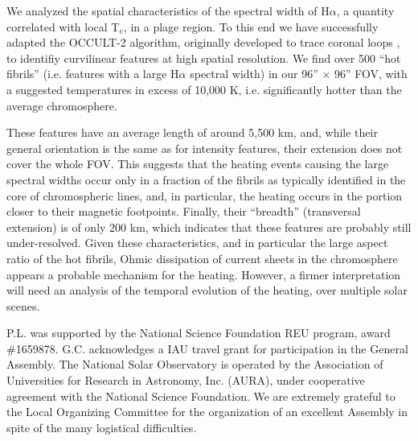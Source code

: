 \documentclass{iau}
\begin{document}
We analyzed the spatial characteristics of the spectral width of H$\alpha$, a quantity correlated with local T$_e$, in a plage region. To this end we have successfully adapted the OCCULT-2 algorithm, originally developed to trace coronal loops \citep{2013Entrp..15.3007A}, to identifiy curvilinear features at high spatial resolution. We find 
over 500 ``hot fibrils'' (i.e. features with a large H$\alpha$ spectral width) in our 96'' $\times$ 96'' FOV, with a suggested temperatures in excess of 10,000 K, i.e. significantly hotter than the average chromosphere. 

These features have an average length of around 5,500 km, and, while their general orientation is the same 
as for intensity features, their extension does not cover the whole FOV. This suggests that the heating events causing the large spectral widths occur only in 
a fraction of the fibrils as typically identified in the core of chromospheric lines, and, in particular, the heating occurs in the portion closer to their magnetic footpoints. 
Finally, their ``breadth'' (transversal extension) is of only 200 km, which indicates that these features are probably still under-resolved. Given these characteristics, and in particular the large aspect ratio of the hot fibrils, Ohmic dissipation of current sheets in the chromosphere appears a probable mechanism for the heating. However, a firmer interpretation will need an analysis of the temporal evolution of the heating, over multiple solar scenes. 


\begin{acknowledgments}
\noindent
P.L. was supported by the National Science Foundation REU program, award \#1659878. G.C. acknowledges a IAU travel grant for participation in the General Assembly. The National Solar Observatory is operated by the Association of Universities for Research in Astronomy, Inc. (AURA),
under cooperative agreement with the National Science Foundation. We are extremely grateful to the Local Organizing Committee for the organization of an excellent  Assembly in spite of the many logistical difficulties.  \end{acknowledgments}




\end{document}
